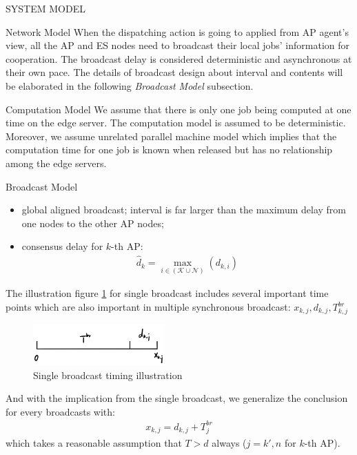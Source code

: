 \documentclass[10pt, conference, letterpaper]{IEEEtran}
\begin{document}
\begin{section}{SYSTEM MODEL}
\begin{subsection}{Network Model}
            When the dispatching action is going to applied from AP agent's view, all the AP and ES nodes need to broadcast their local jobs' information for cooperation. The broadcast delay is considered deterministic and asynchronous at their own pace.
            The details of broadcast design about interval and contents will be elaborated in the following \textit{Broadcast Model} subsection.
        \end{subsection}

        \begin{subsection}{Computation Model}
            We assume that there is only one job being computed at one time on the edge server. The computation model is assumed to be deterministic.
            Moreover, we assume unrelated parallel machine model which implies that the computation time for one job is known when released but has no relationship among the edge servers.
        \end{subsection}

        \begin{subsection}{Broadcast Model}
            \begin{itemize}
                \item global aligned broadcast; interval is far larger than the maximum delay from one nodes to the other AP nodes;
                \item consensus delay for $k$-th AP:
                    \begin{align}
                        \hat{d}_k = \max_{i\in(\mathcal{K} \cup \mathcal{N})}(d_{k,i})
                    \end{align}
            \end{itemize}

            The illustration figure \ref{fig:brd} for single broadcast includes several important time points which are also important in multiple synchronous broadcast: $x_{k,j}, d_{k,j}, T^{br}_{k,j}$
            \begin{figure}[h]
                \centering
                \includegraphics[width=0.45\textwidth]{single-broadcast.png}
                \caption{Single broadcast timing illustration}
                \label{fig:brd}
            \end{figure}
            And with the implication from the single broadcast, we generalize the conclusion for every broadcasts with:
            \begin{align}
                x_{k,j} = d_{k,j} + T^{br}_{j}
            \end{align}
            which takes a reasonable assumption that $T>d$ always ($j=k',n$ for $k$-th AP).
        \end{subsection}
    \end{section}
\end{document}

